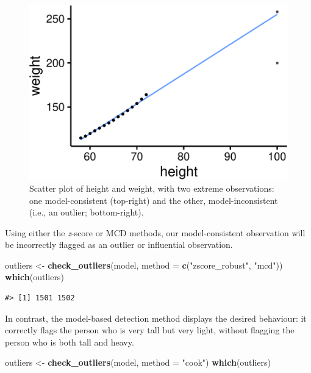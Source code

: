 \documentclass[sn-basic, lineno,pdflatex]{sn-jnl}
\newenvironment{Shaded}{\begin{snugshade}}{\end{snugshade}}
\newcommand{\AttributeTok}[1]{\textcolor[rgb]{0.13,0.29,0.53}{#1}}
\newcommand{\FunctionTok}[1]{\textcolor[rgb]{0.13,0.29,0.53}{\textbf{#1}}}
\newcommand{\NormalTok}[1]{#1}
\newcommand{\OtherTok}[1]{\textcolor[rgb]{0.56,0.35,0.01}{#1}}
\newcommand{\StringTok}[1]{\textcolor[rgb]{0.31,0.60,0.02}{#1}}
\begin{document}
\begin{figure}
\includegraphics[width=1\linewidth]{paper_files/figure-latex/scatter-1} \caption{Scatter plot of height and weight, with two extreme observations: one model-consistent (top-right) and the other, model-inconsistent (i.e., an outlier; bottom-right).}\label{fig:scatter}
\end{figure}

Using either the \emph{z}-score or MCD methods, our model-consistent
observation will be incorrectly flagged as an outlier or influential
observation.

\begin{Shaded}
\begin{Highlighting}[]
\NormalTok{outliers }\OtherTok{\textless{}{-}} \FunctionTok{check\_outliers}\NormalTok{(model, }\AttributeTok{method =} \FunctionTok{c}\NormalTok{(}\StringTok{"zscore\_robust"}\NormalTok{, }\StringTok{"mcd"}\NormalTok{))}
\FunctionTok{which}\NormalTok{(outliers)}
\end{Highlighting}
\end{Shaded}

\begin{verbatim}
#> [1] 1501 1502
\end{verbatim}

In contrast, the model-based detection method displays the desired
behaviour: it correctly flags the person who is very tall but very
light, without flagging the person who is both tall and heavy.

\begin{Shaded}
\begin{Highlighting}[]
\NormalTok{outliers }\OtherTok{\textless{}{-}} \FunctionTok{check\_outliers}\NormalTok{(model, }\AttributeTok{method =} \StringTok{"cook"}\NormalTok{)}
\FunctionTok{which}\NormalTok{(outliers)}
\end{Highlighting}
\end{Shaded}
\end{document}
